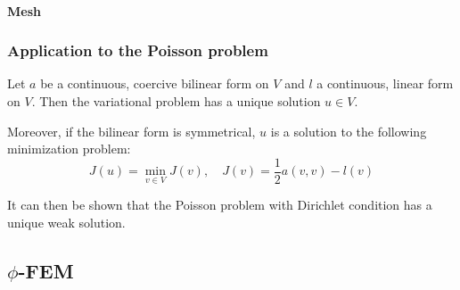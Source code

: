 \paragraph{Mesh}


\begin{Rem}
\end{Rem}

\subsubsection{Application to the Poisson problem}


\begin{Prop}
	
	Let $a$ be a continuous, coercive bilinear form on $V$ and $l$ a continuous, linear form on $V$. Then the variational problem has a unique solution $u\in V$. 
	
	Moreover, if the bilinear form is symmetrical, $u$ is a solution to the following minimization problem:
	\begin{equation*}
		J(u)=\min_{v\in V} J(v), \quad J(v)=\frac{1}{2}a(v,v)-l(v)
	\end{equation*}
\end{Prop}

It can then be shown that the Poisson problem with Dirichlet condition has a unique weak solution.


\subsection{$\phi$-FEM}


